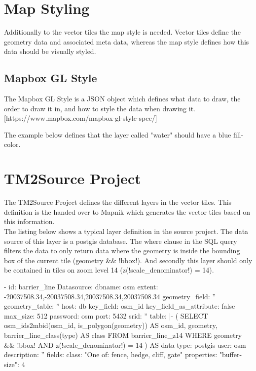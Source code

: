\section{Map Styling}\label{part1_map_styling}

Additionally to the vector tiles the map style is needed. Vector tiles define the geometry data and associated meta data, whereas the map style defines how this data should be visually styled.

\subsection{Mapbox GL Style}

The Mapbox GL Style is a JSON object which defines what data to draw, the order to draw it in, and how to style the data when drawing it. [https://www.mapbox.com/mapbox-gl-style-spec/]

The example below defines that the layer called "water" should have a blue fill-color.



\section{TM2Source Project}\label{par1_tm2source_project}

The TM2Source Project defines the different layers in the vector tiles. This definition is the handed over to Mapnik which generates the vector tiles based on this information.\\
The listing below shows a typical layer definition in the source project. The data source of this layer is a postgis database. The where clause in the SQL query filters the data to only return data where the geometry is inside the bounding box of the current tile (geometry && !bbox!). And secondly this layer should only be contained in tiles on zoom level 14 (z(!scale_denominator!) = 14).

\begin{yamlcode}
- id: barrier_line
    Datasource: 
      dbname: osm
      extent: -20037508.34,-20037508.34,20037508.34,20037508.34
      geometry_field: ''
      geometry_table: ''
      host: db
      key_field: osm_id
      key_field_as_attribute: false
      max_size: 512
      password: osm
      port: 5432
      srid: ''
      table: |-
        (
          SELECT osm_ids2mbid(osm_id, is_polygon(geometry)) AS osm_id, geometry, barrier_line_class(type) AS class
          FROM barrier_line_z14
          WHERE geometry && !bbox!
            AND z(!scale_denominator!) = 14
        ) AS data
      type: postgis
      user: osm
    description: ''
    fields: 
      class: "One of: fence, hedge, cliff, gate"
    properties: 
      "buffer-size": 4
\end{yamlcode}
